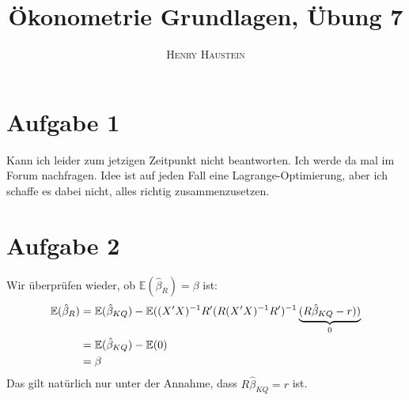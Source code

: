 \documentclass{article}
\title{\textbf{Ökonometrie Grundlagen, Übung 7}}
\author{\textsc{Henry Haustein}}
\date{}
\newcommand{\E}{\mathbb{E}}
\begin{document}
	\maketitle
	
	\section*{Aufgabe 1}
	Kann ich leider zum jetzigen Zeitpunkt nicht beantworten. Ich werde da mal im Forum nachfragen. Idee ist auf jeden Fall eine Lagrange-Optimierung, aber ich schaffe es dabei nicht, alles richtig zusammenzusetzen.
	
	\section*{Aufgabe 2}
	Wir überprüfen wieder, ob $\E(\hat{\beta}_R)=\beta$ ist:
	\begin{align}
		\E(\hat{\beta}_R) &= \E(\hat{\beta}_{KQ}) - \E((X'X)^{-1}R'(R(X'X)^{-1}R')^{-1}\underbrace{(R\hat{\beta}_{KQ} - r))}_{0} \notag \\
		&= \E(\hat{\beta}_{KQ}) - \E(0) \notag \\
		&= \beta \notag
	\end{align}
	Das gilt natürlich nur unter der Annahme, dass $R\hat{\beta}_{KQ} = r$ ist.
	
\end{document}
